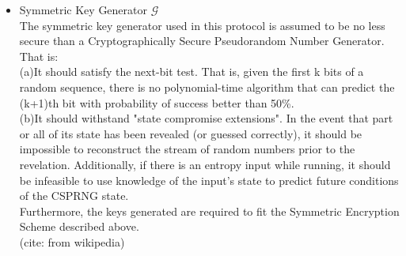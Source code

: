 \begin{itemize}
\item Symmetric Key Generator $\mathcal{G}$\\
The symmetric key generator used in this protocol is assumed to be no less secure than a Cryptographically Secure Pseudorandom Number Generator. That is: \\
(a)It should satisfy the next-bit test. That is, given the first k bits of a random sequence, there is no polynomial-time algorithm that can predict the (k+1)th bit with probability of success better than 50\%. \\
(b)It should withstand "state compromise extensions". In the event that part or all of its state has been revealed (or guessed correctly), it should be impossible to reconstruct the stream of random numbers prior to the revelation. Additionally, if there is an entropy input while running, it should be infeasible to use knowledge of the input's state to predict future conditions of the CSPRNG state.\\
Furthermore, the keys generated are required to fit the Symmetric Encryption Scheme described above.
\\
(cite: from wikipedia)
\end{itemize}

